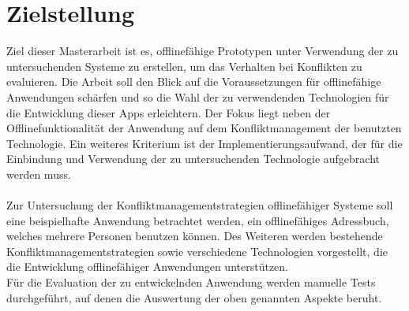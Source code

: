\section{Zielstellung}
Ziel dieser Masterarbeit ist es, offlinefähige Prototypen unter Verwendung der zu untersuchenden Systeme zu erstellen, um das Verhalten bei Konflikten zu evaluieren.
Die Arbeit soll den Blick auf die Voraussetzungen für offlinefähige Anwendungen schärfen und so die Wahl der zu verwendenden Technologien für die Entwicklung dieser \glspl{App} erleichtern.
Der Fokus liegt neben der Offlinefunktionalität der Anwendung auf dem Konfliktmanagement der benutzten Technologie.
Ein weiteres Kriterium ist der Implementierungsaufwand, der für die Einbindung und Verwendung der zu untersuchenden Technologie aufgebracht werden muss.\\\\
%
Zur Untersuchung der Konfliktmanagementstrategien offlinefähiger Systeme soll eine beispielhafte Anwendung betrachtet werden, ein offlinefähiges Adressbuch, welches mehrere Personen benutzen können.
Des Weiteren werden bestehende Konfliktmanagementstrategien sowie verschiedene Technologien vorgestellt, die die Entwicklung offlinefähiger Anwendungen unterstützen.\\
Für die Evaluation der zu entwickelnden Anwendung werden manuelle Tests durchgeführt, auf denen die Auswertung der oben genannten Aspekte beruht.